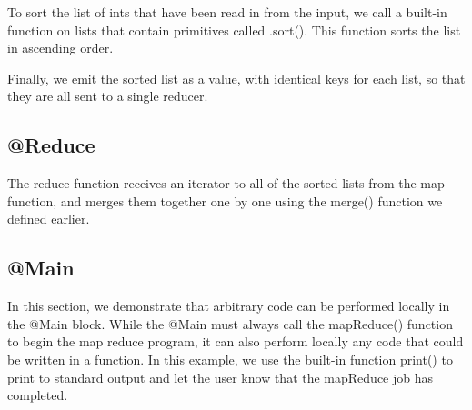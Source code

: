 \documentclass{article} \usepackage{fancyhdr, multicol}
\begin{document}
To sort the list of ints that have been read in from the input, we call a built-in function on lists that contain primitives called .sort(). This function sorts the list in ascending order.

Finally, we emit the sorted list as a value, with identical keys for each list, so that they are all sent to a single reducer.

\subsection*{@Reduce}
The reduce function receives an iterator to all of the sorted lists from the map function, and merges them together one by one using the merge() function we defined earlier.

\subsection*{@Main}
In this section, we demonstrate that arbitrary code can be performed locally in the @Main block. While the @Main must always call the mapReduce() function to begin the map reduce program, it can also perform locally any code that could be written in a function. In this example, we use the built-in function print() to print to standard output and let the user know that the mapReduce job has completed.
\end{document}
